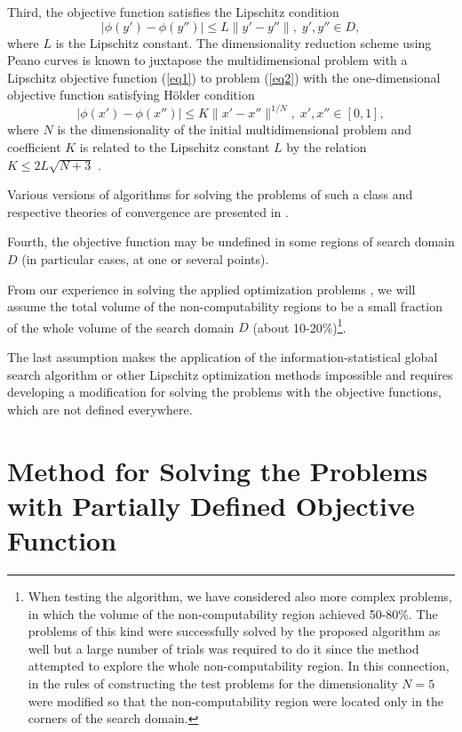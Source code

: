 \documentclass[runningheads]{llncs}
\begin{document}
Third, the objective function satisfies the Lipschitz condition
\begin{equation}\label{eq3} 
| \phi (y')-\phi (y'') | \leq L \| y'-y'' \|, \; y',y'' \in D,
\end{equation}
where $L$ is the Lipschitz constant. The dimensionality reduction scheme using Peano curves is known to juxtapose the multidimensional problem with a Lipschitz objective function (\ref{eq1}) to problem (\ref{eq2}) with the one-dimensional objective function satisfying H{\"o}lder condition
\begin{equation}\label{eq4} 
| \phi (x')-\phi (x'') | \leq K \| x'-x'' \| ^{1/N}, \; x',x'' \in [0,1],
\end{equation}
where $N$ is the dimensionality of the initial multidimensional problem and coefficient $K$ is related to the Lipschitz constant $L$ by the relation $K \leq 2L\sqrt {N+3}$ \cite{Strongin2000}.

Various versions of algorithms for solving the problems of such a class and respective theories of convergence are presented in \cite{Sergeyev2013,Strongin2000}.

Fourth, the objective function may be undefined in some regions of search domain $D$ (in particular cases, at one or several points).

From our experience in solving the applied optimization problems \cite{Barkalov2022,Gubaydullin2022}, we will assume the total volume of the non-computability regions to be a small fraction of the whole volume of the search domain $D$ (about 10-20\%)\footnote{When testing the algorithm, we have considered also more complex problems, in which the volume of the non-computability region achieved 50-80\%. The problems of this kind were successfully solved by the proposed algorithm as well but a large number of trials was required to do it since the method attempted to explore the whole non-computability region. In this connection, in the rules of constructing the test problems for the dimensionality $N=5$ were modified so that the non-computability region were located only in the corners of the search domain.}.

The last assumption makes the application of the information-statistical global search algorithm \cite{Strongin2000} or other Lipschitz optimization methods \cite{PaulaviciusZilinskas2014,Sergeyev2017} impossible and requires developing a modification for solving the problems with the objective functions, which are not defined everywhere.

\section{Method for Solving the Problems with Partially Defined Objective Function}
\end{document}
